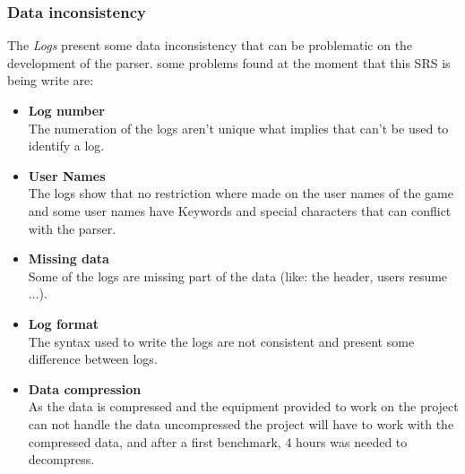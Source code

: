 \documentclass{scrreprt}
\begin{document}
\subsubsection{Data inconsistency}
The \textit{Logs} present some data inconsistency that can be problematic on the
development of the parser.
some problems found at the moment that this SRS is being write are:
\begin{itemize}
  \item \textbf{Log number}\\
    The numeration of the logs aren't unique what implies that can't be used to
    identify a log.
  \item \textbf{User Names}\\
    The logs show that no restriction where made on the user names of the game
    and some user names have Keywords and special characters that can conflict
    with the parser.
   \item \textbf{Missing data}\\
     Some of the logs are missing part of the data (like: the header, users
     resume $\ldots$).
   \item \textbf{Log format}\\
     The syntax used to write the logs are not consistent and present some
     difference between logs.
    \item \textbf{Data compression}\\
      As the data is compressed and the equipment provided to work on the
      project can not handle the data uncompressed the project will have to work
      with the compressed data, and after a first benchmark, 4 hours was needed
      to decompress.
\end{itemize}
\end{document}
